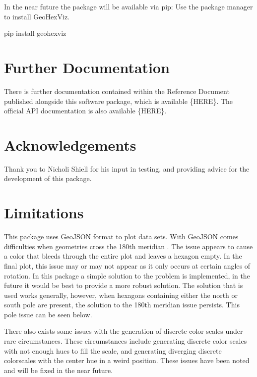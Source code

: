 \documentclass[letterpaper,10pt,english]{sphinxmanual}
\begin{document}
\sphinxAtStartPar
In the near future the package will be available via pip:
Use the package manager  to install GeoHexViz.

\begin{sphinxVerbatim}[commandchars=\\\{\}]
pip install geohexviz
\end{sphinxVerbatim}


\section{Further Documentation}
\label{\detokenize{index:further-documentation}}
\sphinxAtStartPar
There is further documentation contained within the Reference Document
published alongside this software package, which is available \{HERE\}.
The official API documentation is also available \{HERE\}.


\section{Acknowledgements}
\label{\detokenize{index:acknowledgements}}
\sphinxAtStartPar
Thank you to Nicholi Shiell for his input in testing, and providing
advice for the development of this package.


\section{Limitations}
\label{\detokenize{index:limitations}}
\sphinxAtStartPar
This package uses GeoJSON format to plot data sets. With GeoJSON comes
difficulties when geometries cross the 180th meridian . The issue
appears to cause a color that bleeds through the entire plot and leaves
a hexagon empty. In the final plot, this issue may or may not appear as
it only occurs at certain angles of rotation. In this package a simple
solution to the problem is implemented, in the future it would be best
to provide a more robust solution. The solution that is used works
generally, however, when hexagons containing either the north or south
pole are present, the solution to the 180th meridian issue persists.
This pole issue can be seen below.

\sphinxAtStartPar
There also exists some issues with the generation of discrete color
scales under rare circumstances. These circumstances include generating
discrete color scales with not enough hues to fill the scale, and
generating diverging discrete colorscales with the center hue in a weird
position. These issues have been noted and will be fixed in the near
future.
\end{document}
